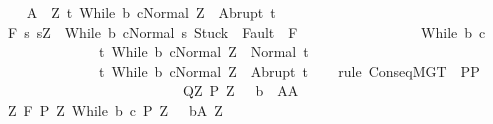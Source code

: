 \begin{isabellebody}
\ \ \isamarkupfalse%
\ {\isacharquery}A{\isacharprime}\ {\isacharequal}\ {\isachardoublequoteopen}{\isasymlambda}Z{\isachardot}\ {\isacharbraceleft}t{\isachardot}\ {\isasymGamma}{\isasymturnstile}{\isasymlangle}While\ b\ c{\isacharcomma}Normal\ Z{\isasymrangle}\ {\isasymRightarrow}\ Abrupt\ t{\isacharbraceright}{\isachardoublequoteclose}\isanewline
\ \ \isamarkupfalse%
\ {\isachardoublequoteopen}{\isasymGamma}{\isacharcomma}{\isasymTheta}{\isasymturnstile}\isactrlbsub {\isacharslash}F\isactrlesub \ {\isacharbraceleft}s{\isachardot}\ s{\isacharequal}Z\ {\isasymand}\ {\isasymGamma}{\isasymturnstile}{\isasymlangle}While\ b\ c{\isacharcomma}Normal\ s{\isasymrangle}\ {\isasymRightarrow}{\isasymnotin}{\isacharparenleft}{\isacharbraceleft}Stuck{\isacharbraceright}\ {\isasymunion}\ Fault\ {\isacharbackquote}\ {\isacharparenleft}{\isacharminus}F{\isacharparenright}{\isacharparenright}{\isacharbraceright}\ \isanewline
\ \ \ \ \ \ \ \ \ \ \ \ \ \ \ \ While\ b\ c\isanewline
\ \ \ \ \ \ \ \ \ \ \ \ \ \ {\isacharbraceleft}t{\isachardot}\ {\isasymGamma}{\isasymturnstile}{\isasymlangle}While\ b\ c{\isacharcomma}Normal\ Z{\isasymrangle}\ {\isasymRightarrow}\ Normal\ t{\isacharbraceright}{\isacharcomma}\isanewline
\ \ \ \ \ \ \ \ \ \ \ \ \ \ {\isacharbraceleft}t{\isachardot}\ {\isasymGamma}{\isasymturnstile}{\isasymlangle}While\ b\ c{\isacharcomma}Normal\ Z{\isasymrangle}\ {\isasymRightarrow}\ Abrupt\ t{\isacharbraceright}{\isachardoublequoteclose}\isanewline
\ \ \isamarkupfalse%
\ {\isacharparenleft}rule\ ConseqMGT\ {\isacharbrackleft}\ {\isacharquery}P{\isacharprime}{\isacharequal}{\isachardoublequoteopen}{\isacharquery}P{\isacharprime}{\isachardoublequoteclose}\ \isanewline
\ \ \ \ \ \ \ \ \ \ \ \ \ \ \ \ \ \ \ \ \ \ \ \ \ \ {\isacharquery}Q{\isacharprime}{\isacharequal}{\isachardoublequoteopen}{\isasymlambda}Z{\isachardot}\ {\isacharquery}P{\isacharprime}\ Z\ {\isasyminter}\ {\isacharminus}\ b{\isachardoublequoteclose}\ \ {\isacharquery}A{\isacharprime}{\isacharequal}{\isachardoublequoteopen}{\isacharquery}A{\isacharprime}{\isachardoublequoteclose}{\isacharbrackright}{\isacharparenright}\isanewline
\ \ \ \ \isamarkupfalse%
\ {\isachardoublequoteopen}{\isasymforall}Z{\isachardot}\ {\isasymGamma}{\isacharcomma}{\isasymTheta}{\isasymturnstile}\isactrlbsub {\isacharslash}F\isactrlesub \ {\isacharparenleft}{\isacharquery}P{\isacharprime}\ Z{\isacharparenright}\ {\isacharparenleft}While\ b\ c{\isacharparenright}\ {\isacharparenleft}{\isacharquery}P{\isacharprime}\ Z\ {\isasyminter}\ {\isacharminus}\ b{\isacharparenright}{\isacharcomma}{\isacharparenleft}{\isacharquery}A{\isacharprime}\ Z{\isacharparenright}{\isachardoublequoteclose}\isanewline

\end{isabellebody}
